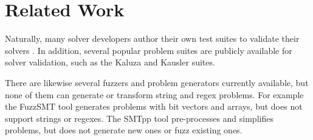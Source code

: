 \section{Related Work}

    Naturally, many solver developers author their own test suites to validate their solvers \cite{cvc4-tests} \cite{z3str3-tests} \cite{z3str2-tests}. In addition, several popular problem suites are publicly available for solver validation, such as the Kaluza \cite{kaluza} and Kausler \cite{kausler} suites.

    There are likewise several fuzzers and problem generators currently available, but none of them can generate or transform string and regex problems. For example the FuzzSMT\cite{fuzzsmt} tool generates \smt{} problems with bit vectors and arrays, but does not support strings or regexes. The SMTpp\cite{smtpp} tool pre-processes and simplifies problems, but does not generate new ones or fuzz existing ones.

